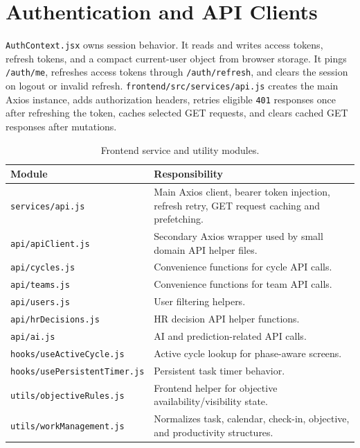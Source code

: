 \section{Authentication and API Clients}
\texttt{AuthContext.jsx} owns session behavior. It reads and writes access tokens, refresh tokens, and a compact current-user object from browser storage. It pings \texttt{/auth/me}, refreshes access tokens through \texttt{/auth/refresh}, and clears the session on logout or invalid refresh. \texttt{frontend/src/services/api.js} creates the main Axios instance, adds authorization headers, retries eligible \texttt{401} responses once after refreshing the token, caches selected GET requests, and clears cached GET responses after mutations.

\begin{table}[H]\centering\small
\caption{Frontend service and utility modules.}
\label{tab:frontend-services}
\begin{tabularx}{\textwidth}{p{}Y}
\toprule
Module & Responsibility\\
\midrule
\texttt{services/api.js} & Main Axios client, bearer token injection, refresh retry, GET request caching and prefetching.\\
\texttt{api/apiClient.js} & Secondary Axios wrapper used by small domain API helper files.\\
\texttt{api/cycles.js} & Convenience functions for cycle API calls.\\
\texttt{api/teams.js} & Convenience functions for team API calls.\\
\texttt{api/users.js} & User filtering helpers.\\
\texttt{api/hrDecisions.js} & HR decision API helper functions.\\
\texttt{api/ai.js} & AI and prediction-related API calls.\\
\texttt{hooks/useActiveCycle.js} & Active cycle lookup for phase-aware screens.\\
\texttt{hooks/usePersistentTimer.js} & Persistent task timer behavior.\\
\texttt{utils/objectiveRules.js} & Frontend helper for objective availability/visibility state.\\
\texttt{utils/workManagement.js} & Normalizes task, calendar, check-in, objective, and productivity structures.\\
\bottomrule
\end{tabularx}
\end{table}

